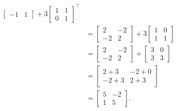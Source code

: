 \begin{questions}
\begin{solution}
\begin{align*}
\begin{bmatrix}
          -1&1
        \end{bmatrix}
       +3\begin{bmatrix}
         1&1\\
         0&1
       \end{bmatrix}^\intercal\\%
      &=
        \begin{bmatrix}
          2&-2\\
          -2&2
        \end{bmatrix}
      +3\begin{bmatrix}
        1&0\\
        1&1
      \end{bmatrix}\\
      &=\begin{bmatrix}
          2&-2\\
          -2&2
        \end{bmatrix}
      +\begin{bmatrix}
        3&0\\
        3&3
      \end{bmatrix}\\
      &=\begin{bmatrix}
        2+3&-2+0\\
        -2+3&2+3
      \end{bmatrix}\\
      &=\begin{bmatrix}
        5&-2\\
        1&5
      \end{bmatrix}.
    \end{align*}
  \end{solution}
\end{questions}

